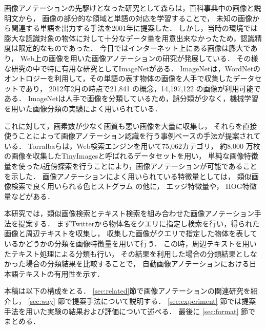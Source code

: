 画像アノテーションの先駆けとなった研究として森ら\cite{mori}は，百科事典中の画像と説明文から，
画像の部分的な領域と単語の対応を学習することで，
未知の画像から関連する単語を出力する手法を2001年に提案した．
しかし，当時の環境では膨大な認識対象の物体に対して十分なデータ量を用意出来なかったため，認識精度は限定的なものであった．
今日ではインターネット上にある画像は膨大であり，
Web上の画像を用いた画像アノテーションの研究が発展している．
その様な研究の中で特に有用な研究としてImageNet\cite{imagenet}がある．
ImageNet\cite{imagenet}は，WordNetのオントロジーを利用して，その単語の表す物体の画像を人手で収集したデータセットであり，
2012年2月の時点で21,841 の概念，14,197,122 の画像が利用可能である．
ImageNetは人手で画像を分類しているため，誤分類が少なく，機械学習を用いた画像分類の実験によく用いられている． 

これに対して，画素数が少なく画質も悪い画像を大量に収集し，
それらを直接使うことによって画像アノテーション認識を行う事例ベースの手法が提案されている．
Torralba\cite{torralba}らは，Web検索エンジンを用いて75,062カテゴリ，
約8,000 万枚の画像を収集したTinyImagesと呼ばれるデータセットを用い，
単純な画像特徴量を使った{\it k}近傍探索を行うことにより，画像アノテーションが可能であることを示した．
%
%
%
画像アノテーションによく用いられている特徴量としては，
類似画像検索で良く用いられる色ヒストグラム
の他に，
エッジ特徴量や，
HOG特徴量\cite{dalal}などがある．

本研究では，類似画像検索とテキスト検索を組み合わせた画像アノテーション手法を提案する．
まずTwitterから物体名をクエリに指定し検索を行い，得られた画像と周辺テキストを収集し，
収集した画像がクエリで指定した物体を表しているかどうかの分類を画像特徴量を用いて行う．
この時，周辺テキストを用いたテキスト処理による分類も行い，
その結果を利用した場合の分類結果としなかった場合の分類結果を比較することで，
自動画像アノテーションにおける日本語テキストの有用性を示す．


本稿は以下の構成をとる．
\ref{sec:related}節で画像アノテーションの関連研究を紹介し，
\ref{sec:way}
節で提案手法について説明する．
\ref{sec:experiment}
節では提案手法を用いた実験の結果および評価について述べる．
最後に
\ref{sec:format}
節でまとめる．

